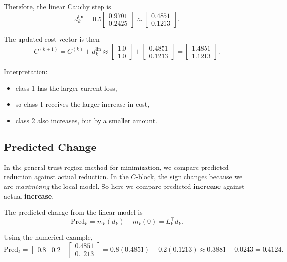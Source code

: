 \documentclass{article}
\begin{document}
Therefore, the linear Cauchy step is
\begin{equation}
 d_k^{\mathrm{lin}}
 = 0.5
 \begin{bmatrix}0.9701 \\ 0.2425\end{bmatrix}
 \approx
 \begin{bmatrix}0.4851 \\ 0.1213\end{bmatrix}.
\end{equation}

The updated cost vector is then
\begin{equation}
 C^{(k+1)} = C^{(k)} + d_k^{\mathrm{lin}}
 \approx
 \begin{bmatrix}1.0 \\ 1.0\end{bmatrix}
 +
 \begin{bmatrix}0.4851 \\ 0.1213\end{bmatrix}
 =
 \begin{bmatrix}1.4851 \\ 1.1213\end{bmatrix}.
\end{equation}

Interpretation:
\begin{itemize}
    \item class 1 has the larger current loss,
    \item so class 1 receives the larger increase in cost,
    \item class 2 also increases, but by a smaller amount.
\end{itemize}

\subsection{Predicted Change}

In the general trust-region method for minimization, we compare predicted reduction against actual reduction. In the $C$-block, the sign changes because we are \emph{maximizing} the local model. So here we compare predicted \textbf{increase} against actual \textbf{increase}.

The predicted change from the linear model is
\begin{equation}
 \mathrm{Pred}_k = m_k(d_k) - m_k(0) = L_k^\top d_k.
\end{equation}

Using the numerical example,
\begin{equation}
 \mathrm{Pred}_k
 =
 \begin{bmatrix}0.8 & 0.2\end{bmatrix}
 \begin{bmatrix}0.4851 \\ 0.1213\end{bmatrix}
 = 0.8(0.4851) + 0.2(0.1213)
 \approx 0.3881 + 0.0243
 = 0.4124.
\end{equation}
\end{document}
